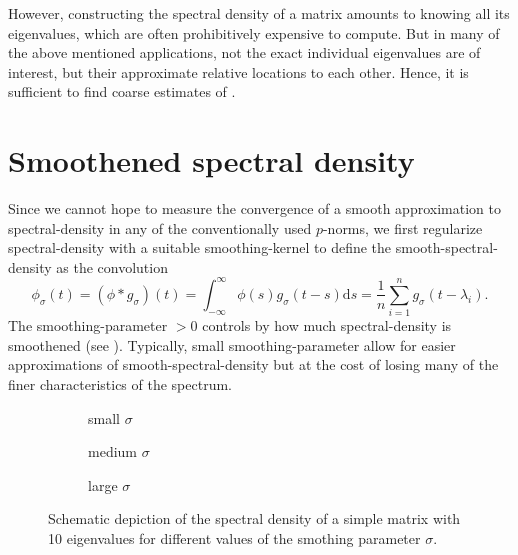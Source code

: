 However, constructing the spectral density of a matrix amounts to knowing all
its eigenvalues, which are often prohibitively expensive to
compute. But in many of the above mentioned applications, not the exact individual
eigenvalues are of interest, but their approximate relative locations to each
other. Hence, it is sufficient to find coarse estimates of .


\section{Smoothened spectral density}
\label{sec:1-introduction-properties}

Since we cannot hope to measure the convergence of a smooth approximation to
\gls{spectral-density} in any of the conventionally used $p$-norms,
we first regularize \gls{spectral-density} with a suitable \gls{smoothing-kernel}
to define the \gls{smooth-spectral-density} as the convolution
\begin{equation}
    \phi_{\sigma}(t) = (\phi \ast g_{\sigma})(t) = \int_{-\infty}^{\infty} \phi(s) g_{\sigma}(t - s) \mathrm{d}s = \frac{1}{n} \sum_{i=1}^{n} g_{\sigma}(t - \lambda_i).
    \label{equ:1-introduction-def-smooth-spectral-density}
\end{equation}
The \gls{smoothing-parameter} $>0$ controls by how much \gls{spectral-density} is
smoothened (see ). Typically,
small \gls{smoothing-parameter} allow for easier approximations of \gls{smooth-spectral-density}
but at the cost of losing many of the finer characteristics of the spectrum.\\

\begin{figure}[ht]
    \begin{subfigure}[b]{0.32\columnwidth}
        
        \caption{small $\sigma$}
        \label{fig:1-introduction-spectral-density-example-0.01}
    \end{subfigure}
    \begin{subfigure}[b]{0.32\columnwidth}
        
        \caption{medium $\sigma$}
        \label{fig:1-introduction-spectral-density-example-0.02}
    \end{subfigure}
    \begin{subfigure}[b]{0.32\columnwidth}
        
        \caption{large $\sigma$}
        \label{fig:1-introduction-spectral-density-example-0.05}
    \end{subfigure}
    \caption{Schematic depiction of the spectral density of a simple matrix with
    10 eigenvalues for different values of the smothing parameter $\sigma$.}
    \label{fig:1-introduction-smoothened-spectral-density}
\end{figure}

